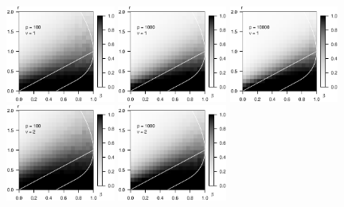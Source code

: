 \begin{figure}
      \centering
      \includegraphics[width=0.32\textwidth]{sim_weak_boundary/simulated_weak_boundary_chi-squared_nu1_p100.eps}
      \includegraphics[width=0.32\textwidth]{sim_weak_boundary/simulated_weak_boundary_chi-squared_nu1_p1000.eps}
      \includegraphics[width=0.32\textwidth]{sim_weak_boundary/simulated_weak_boundary_chi-squared_nu1_p10000.eps}
      \includegraphics[width=0.32\textwidth]{sim_weak_boundary/simulated_weak_boundary_chi-squared_nu2_p100.eps}
      \includegraphics[width=0.32\textwidth]{sim_weak_boundary/simulated_weak_boundary_chi-squared_nu2_p1000.eps}

\end{figure}
